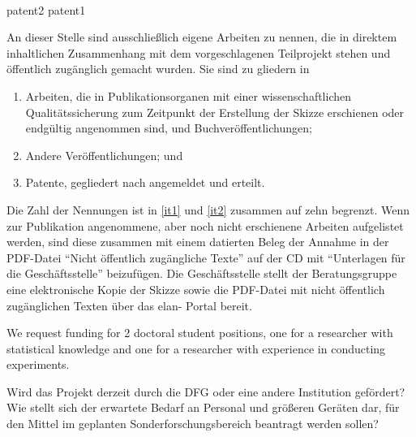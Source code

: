 \blindtext \textcite{test3}

\notocsubsubsection{\respr}

\paragraph{\resprp}

\blindtext

\paragraph{\role}

\blindtext

\patentbib%
  {patent2}%
  {patent1}%
\label{sec:ownpub}

\begin{erklaerung}
  An dieser Stelle sind ausschließlich eigene Arbeiten
  \parencite{test1} zu nennen, die in direktem inhaltlichen
  Zusammenhang mit dem vorgeschlagenen Teilprojekt stehen und
  öffentlich zugänglich gemacht wurden. Sie sind zu gliedern in
  \begin{enumerate}
    \renewcommand{\theenumi}{\alph{enumi}}
  \item \label{it1} Arbeiten, die in Publikationsorganen mit einer
    wissenschaftlichen Qualitätssicherung zum Zeitpunkt der Erstellung
    der Skizze erschienen oder endgültig angenommen sind, und
    Buchveröffentlichungen;
  \item \label{it2} Andere Veröffentlichungen; und
  \item Patente, gegliedert nach angemeldet und erteilt.
  \end{enumerate}
  Die Zahl der Nennungen ist in \ref{it1} und \ref{it2} zusammen auf
  zehn begrenzt. Wenn zur Publikation angenommene, aber noch nicht
  erschienene Arbeiten aufgelistet werden, sind diese zusammen mit
  einem datierten Beleg der Annahme in der PDF-Datei \enquote{Nicht
    öffentlich zugängliche Texte} auf der CD mit \enquote{Unterlagen
    für die Geschäftsstelle} beizufügen. Die Geschäftsstelle stellt
  der Beratungsgruppe eine elektronische Kopie der Skizze sowie die
  PDF-Datei mit nicht öffentlich zugänglichen Texten über das elan-
  Portal bereit.
\end{erklaerung}

\notocsubsection{\funds}

We request funding for 2 doctoral student positions, one for a
researcher with statistical knowledge and one for a researcher with
experience in conducting experiments.

\begin{erklaerung}
  Wird das Projekt derzeit durch die DFG oder eine andere Institution
  gefördert? Wie stellt sich der erwartete Bedarf an Personal und
  größeren Geräten dar, für den Mittel im geplanten
  Sonderforschungsbereich beantragt werden sollen?
\end{erklaerung}
